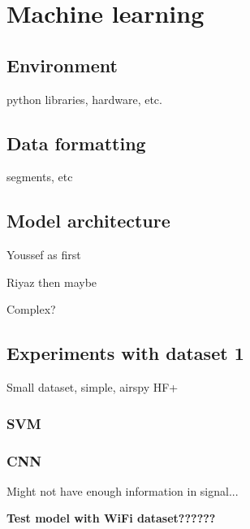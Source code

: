 \section{Machine learning}

\subsection{Environment}

python libraries, hardware, etc.

\subsection{Data formatting}

segments, etc

\subsection{Model architecture}

Youssef as first

Riyaz then maybe

Complex?

\subsection{Experiments with dataset 1}

Small dataset, simple, airspy HF+

\subsubsection{SVM}

\subsubsection{CNN}

Might not have enough information in signal...


\textbf{Test model with WiFi dataset??????}
